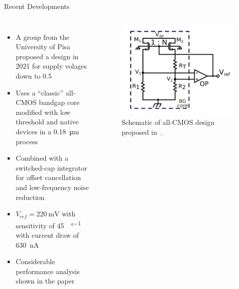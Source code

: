 \documentclass[aspectratio=1610]{beamer} %
\begin{document}
\begin{frame}{Recent Developments}{}

    \begin{columns}[c]
        \begin{itemize}
            \item A group from the University of Pisa proposed a design in 2021 for supply volages down to \qty{0.5}~\cite{Ria2021}
            \item Uses a ``classic'' all-CMOS bandgap core modified with low threshold and native devices in a \qty{0.18}{\um} process
            \item Combined with a switched-cap integrator for offset cancellation and low-frequency noise reduction
            \item \(V_{ref} = \qty{220}{\mV}\) with sensitivity of \qty{45}{\ppm\per\degree\C} with current draw of \qty{630}{\nA}
            \item Considerable performance analysis shown in the paper
        \end{itemize}
    
        \begin{figure}
            \includegraphics[width=0.7\columnwidth]{oops_all_cmos.png}
            \caption{Schematic of all-CMOS design proposed in~\cite{Ria2021}.}
        \end{figure}
    \end{columns}
\end{frame}
\end{document}
